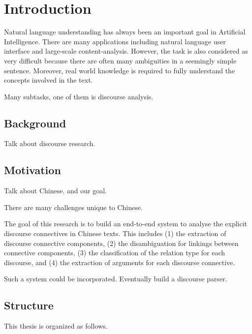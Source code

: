 %
%
%
\chapter{Introduction}
\label{c:intro}

Natural language understanding has always been an important goal in Artificial Intelligence.
There are many applications including natural language user interface and large-scale content-analysis.
However, the task is also considered as very difficult because there are often many ambiguities in a seemingly
simple sentence. Moreover, real world knowledge is required to fully understand the concepts
involved in the text.

Many subtasks, one of them is discourse analysis.

%
%
\section{Background}

Talk about discourse research.




%
%
\section{Motivation}

Talk about Chinese. and our goal.

There are many challenges unique to Chinese.

The goal of this research is to build an end-to-end system to analyse the explicit discourse
connectives in Chinese texts. This includes (1) the extraction of discourse connective
components, (2) the disambiguation for linkings between connective components, (3) the classification
of the relation type for each discourse, and (4) the extraction of arguments for each discourse connective.

Such a system could be incorporated. Eventually build a discourse parser.

%
%
\section{Structure}
This thesis is organized as follows.
